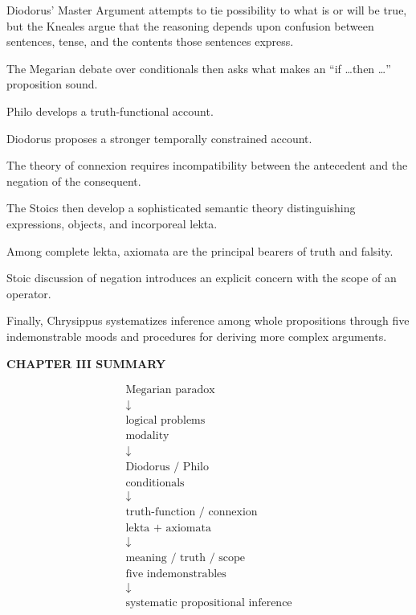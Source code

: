 \documentclass[11pt]{article}
\begin{document}
Diodorus' Master Argument attempts to tie possibility to what is
or will be true, but the Kneales argue that the reasoning depends
upon confusion between sentences, tense, and the contents those
sentences express.

The Megarian debate over conditionals then asks what makes an
``if \ldots then \ldots'' proposition sound.

Philo develops a truth-functional account.

Diodorus proposes a stronger temporally constrained account.

The theory of connexion requires incompatibility between the
antecedent and the negation of the consequent.

The Stoics then develop a sophisticated semantic theory
distinguishing expressions, objects, and incorporeal lekta.

Among complete lekta, axiomata are the principal bearers of
truth and falsity.

Stoic discussion of negation introduces an explicit concern with
the scope of an operator.

Finally, Chrysippus systematizes inference among whole
propositions through five indemonstrable moods and procedures
for deriving more complex arguments.

\begin{whiteboard}
\textbf{CHAPTER III SUMMARY}

\[
\begin{array}{c}
\text{Megarian paradox}\\
\downarrow\\
\text{logical problems}
\\[0.8em]
\text{modality}\\
\downarrow\\
\text{Diodorus / Philo}
\\[0.8em]
\text{conditionals}\\
\downarrow\\
\text{truth-function / connexion}
\\[0.8em]
\text{lekta + axiomata}\\
\downarrow\\
\text{meaning / truth / scope}
\\[0.8em]
\text{five indemonstrables}\\
\downarrow\\
\text{systematic propositional inference}
\end{array}
\]
\end{whiteboard}
\end{document}
